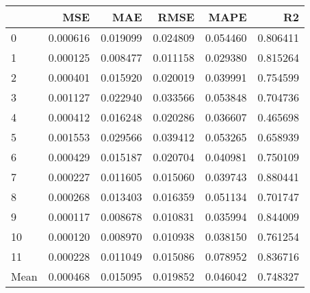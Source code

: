 \begin{tabular}{lrrrrr}
\toprule
 & MSE & MAE & RMSE & MAPE & R2 \\
\midrule
0 & 0.000616 & 0.019099 & 0.024809 & 0.054460 & 0.806411 \\
1 & 0.000125 & 0.008477 & 0.011158 & 0.029380 & 0.815264 \\
2 & 0.000401 & 0.015920 & 0.020019 & 0.039991 & 0.754599 \\
3 & 0.001127 & 0.022940 & 0.033566 & 0.053848 & 0.704736 \\
4 & 0.000412 & 0.016248 & 0.020286 & 0.036607 & 0.465698 \\
5 & 0.001553 & 0.029566 & 0.039412 & 0.053265 & 0.658939 \\
6 & 0.000429 & 0.015187 & 0.020704 & 0.040981 & 0.750109 \\
7 & 0.000227 & 0.011605 & 0.015060 & 0.039743 & 0.880441 \\
8 & 0.000268 & 0.013403 & 0.016359 & 0.051134 & 0.701747 \\
9 & 0.000117 & 0.008678 & 0.010831 & 0.035994 & 0.844009 \\
10 & 0.000120 & 0.008970 & 0.010938 & 0.038150 & 0.761254 \\
11 & 0.000228 & 0.011049 & 0.015086 & 0.078952 & 0.836716 \\
Mean & 0.000468 & 0.015095 & 0.019852 & 0.046042 & 0.748327 \\
\bottomrule
\end{tabular}
